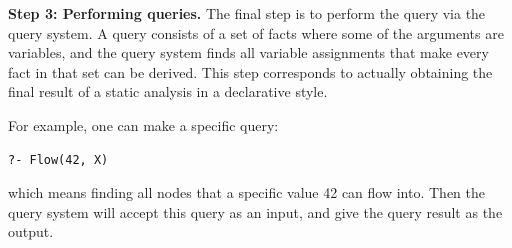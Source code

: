 \smallskip
\textbf{Step 3: Performing queries.}
The final step is to perform the query via the query system.  A query consists
of a set of facts where some of the arguments are variables, and the query system finds all variable
assignments that make every fact in that set can be derived. This step corresponds
to actually obtaining the final result of a static analysis in a declarative
style. 

For example, one can make a specific query:

\begin{lstlisting}[style=mrule]
?- Flow(42, X)
\end{lstlisting}

which means finding all nodes that a specific value 42 can flow into.
Then the query system will accept this query as an input, and give
the query result as the output.


